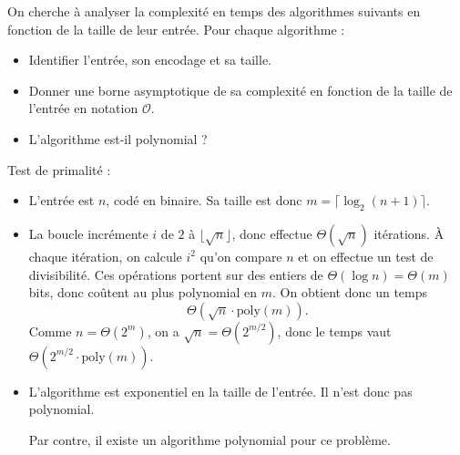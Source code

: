 
\begingroup

\begin{exercice}

  On cherche à analyser la complexité en temps des algorithmes suivants en fonction de la taille de leur entrée.
  Pour chaque algorithme :
  \begin{itemize}
  \item Identifier l'entrée, son encodage et sa taille.
  \item Donner une borne asymptotique de sa complexité en fonction de la taille de l'entrée en notation $\mathcal{O}$.
  \item L'algorithme est-il polynomial ?
  \end{itemize}

  \begin{questions}
  \item Test de primalité :
  \end{questions}
  
  \begin{algorithm}[H]
  \end{algorithm}
  \begin{corrections}
    \begin{itemize}
    \item L'entrée est $n$, codé en binaire. Sa taille est donc $m = \lceil \log_2(n+1) \rceil$.
    \item La boucle incrémente $i$ de $2$ à $\lfloor \sqrt{n} \rfloor$, donc effectue $\Theta(\sqrt{n})$ itérations.
      À chaque itération, on calcule $i^2$ qu'on compare $n$ et on effectue un test de divisibilité.
      Ces opérations portent sur des entiers de $\Theta(\log n)=\Theta(m)$ bits, donc coûtent au plus polynomial en $m$.
      On obtient donc un temps
      $$\Theta(\sqrt{n}\cdot \mathrm{poly}(m)).$$
      Comme $n = \Theta(2^m)$, on a $\sqrt{n}=\Theta(2^{m/2})$, donc le temps vaut
      $\Theta(2^{m/2}\cdot \mathrm{poly}(m)).$
    \item L'algorithme est exponentiel en la taille de l'entrée. Il n'est donc pas polynomial.
      
      Par contre, il existe un algorithme polynomial pour ce problème.
    \end{itemize}
  \end{corrections}


\end{exercice}
